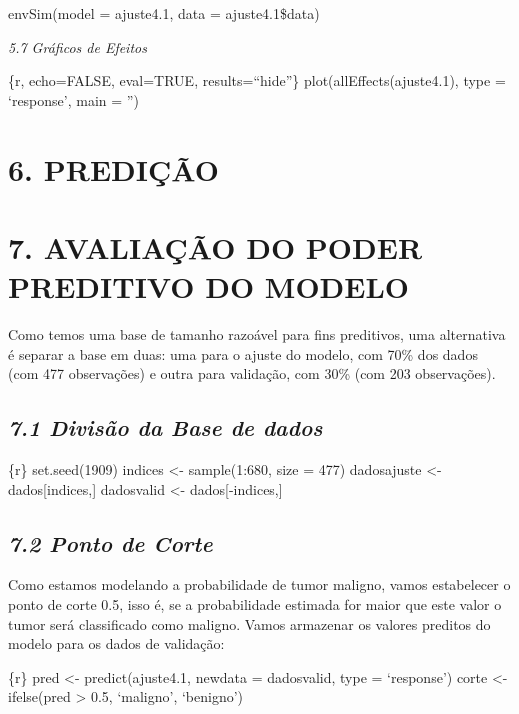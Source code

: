 \documentclass[
]{article}
\begin{document}
envSim(model = ajuste4.1, data = ajuste4.1\$data)

\emph{5.7 Gráficos de Efeitos}

\{r, echo=FALSE, eval=TRUE, results=``hide''\}
plot(allEffects(ajuste4.1), type = `response', main = '')

\hypertarget{prediuxe7uxe3o}{%
\section{6. PREDIÇÃO}\label{prediuxe7uxe3o}}

\hypertarget{avaliauxe7uxe3o-do-poder-preditivo-do-modelo}{%
\section{7. AVALIAÇÃO DO PODER PREDITIVO DO
MODELO}\label{avaliauxe7uxe3o-do-poder-preditivo-do-modelo}}

Como temos uma base de tamanho razoável para fins preditivos, uma
alternativa é separar a base em duas: uma para o ajuste do modelo, com
70\% dos dados (com 477 observações) e outra para validação, com 30\%
(com 203 observações).

\hypertarget{divisuxe3o-da-base-de-dados}{%
\subsection{\texorpdfstring{\emph{7.1 Divisão da Base de
dados}}{7.1 Divisão da Base de dados}}\label{divisuxe3o-da-base-de-dados}}

\{r\} set.seed(1909) indices \textless- sample(1:680, size = 477)
dadosajuste \textless- dados{[}indices,{]} dadosvalid \textless-
dados{[}-indices,{]}

\hypertarget{ponto-de-corte}{%
\subsection{\texorpdfstring{\emph{7.2 Ponto de
Corte}}{7.2 Ponto de Corte}}\label{ponto-de-corte}}

Como estamos modelando a probabilidade de tumor maligno, vamos
estabelecer o ponto de corte 0.5, isso é, se a probabilidade estimada
for maior que este valor o tumor será classificado como maligno. Vamos
armazenar os valores preditos do modelo para os dados de validação:

\{r\} pred \textless- predict(ajuste4.1, newdata = dadosvalid, type =
`response') corte \textless- ifelse(pred \textgreater{} 0.5, `maligno',
`benigno')
\end{document}
